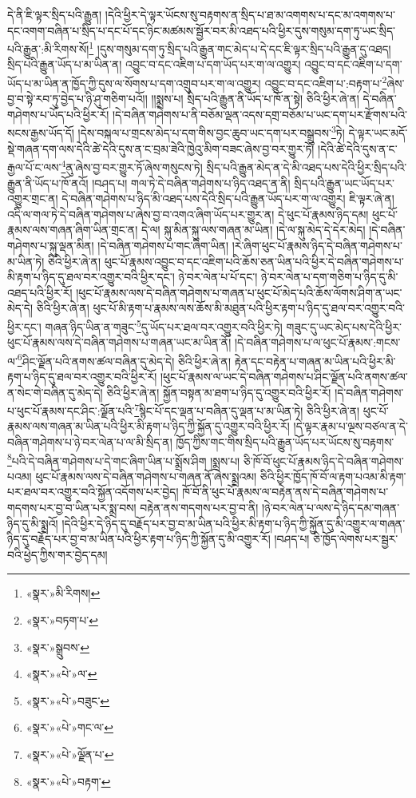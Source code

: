 དེ་ནི་ཇི་ལྟར་སྲིད་པའི་རྒྱུན། །དེའི་ཕྱིར་དེ་ལྟར་ཡོངས་སུ་བརྟགས་ན་སྲིད་པ་ཐ་མ་འགགས་པ་དང་མ་འགགས་པ་དང་འགག་བཞིན་པ་སྲིད་པ་དང་པོ་དང་ཉིང་མཚམས་སྦྱོར་བར་མི་འཐད་པའི་ཕྱིར་དུས་གསུམ་དག་ཏུ་ཡང་སྲིད་པའི་རྒྱུན་:མི་རིགས་སོ།\footnote{«སྣར་»མི་རིགས།} །དུས་གསུམ་དག་ཏུ་སྲིད་པའི་རྒྱུན་གང་མེད་པ་དེ་དང་ཇི་ལྟར་སྲིད་པའི་རྒྱུན་དུ་འཐད། སྲིད་པའི་རྒྱུན་ཡོད་པ་མ་ཡིན་ན། འབྱུང་བ་དང་འཇིག་པ་དག་ཡོད་པར་ག་ལ་འགྱུར། འབྱུང་བ་དང་འཇིག་པ་དག་ཡོད་པ་མ་ཡིན་ན་ཁྱོད་ཀྱི་དུས་ལ་སོགས་པ་དག་འགྲུབ་པར་ག་ལ་འགྱུར། འབྱུང་བ་དང་འཇིག་པ་:བརྟག་པ་\footnote{«སྣར་»བཏག་པ་}ཞེས་བྱ་བ་སྟེ་རབ་ཏུ་བྱེད་པ་ཉི་ཤུ་གཅིག་པའོ།། །།སྨྲས་པ། སྲིད་པའི་རྒྱུན་ནི་ཡོད་པ་ཁོ་ན་སྟེ། ཅིའི་ཕྱིར་ཞེ་ན། དེ་བཞིན་གཤེགས་པ་ཡོད་པའི་ཕྱིར་རོ། །དེ་བཞིན་གཤེགས་པ་ནི་བཅོམ་ལྡན་འདས་དགྲ་བཅོམ་པ་ཡང་དག་པར་རྫོགས་པའི་སངས་རྒྱས་ཡོད་དོ། །དེས་བསྐལ་པ་གྲངས་མེད་པ་དག་གིས་བྱང་ཆུབ་ཡང་དག་པར་བསྒྲུབས་\footnote{«སྣར་»སྒྲུབས་}ཏེ། དེ་ལྟར་ཡང་མདོ་སྡེ་གཞན་དག་ལས་དེའི་ཚེ་དེའི་དུས་ན་ང་བྲམ་ཟེའི་ཁྱེའུ་མིག་བཟང་ཞེས་བྱ་བར་གྱུར་ཏོ། །དེའི་ཚེ་དེའི་དུས་ན་ང་རྒྱལ་པོ་ང་ལས་\footnote{«སྣར་»«པེ་»ལ་}ནུ་ཞེས་བྱ་བར་གྱུར་ཏོ་ཞེས་གསུངས་ཏེ། སྲིད་པའི་རྒྱུན་མེད་ན་དེ་མི་འཐད་པས་དེའི་ཕྱིར་སྲིད་པའི་རྒྱུན་ནི་ཡོད་པ་ཁོ་ནའོ། །བཤད་པ། གལ་ཏེ་དེ་བཞིན་གཤེགས་པ་ཉིད་འཐད་ན་ནི། སྲིད་པའི་རྒྱུན་ཡང་ཡོད་པར་འགྱུར་གྲང་ན། དེ་བཞིན་གཤེགས་པ་ཉིད་མི་འཐད་པས་དེའི་སྲིད་པའི་རྒྱུན་ཡོད་པར་ག་ལ་འགྱུར། ཇི་ལྟར་ཞེ་ན། འདི་ལ་གལ་ཏེ་དེ་བཞིན་གཤེགས་པ་ཞེས་བྱ་བ་འགའ་ཞིག་ཡོད་པར་གྱུར་ན། དེ་ཕུང་པོ་རྣམས་ཉིད་དམ། ཕུང་པོ་རྣམས་ལས་གཞན་ཞིག་ཡིན་གྲང་ན། དེ་ལ། སྐུ་མིན་སྐུ་ལས་གཞན་མ་ཡིན། །དེ་ལ་སྐུ་མེད་དེ་དེར་མེད། །དེ་བཞིན་གཤེགས་པ་སྐུ་ལྡན་མིན། །དེ་བཞིན་གཤེགས་པ་གང་ཞིག་ཡིན། །རེ་ཞིག་ཕུང་པོ་རྣམས་ཉིད་དེ་བཞིན་གཤེགས་པ་མ་ཡིན་ཏེ། ཅིའི་ཕྱིར་ཞེ་ན། ཕུང་པོ་རྣམས་འབྱུང་བ་དང་འཇིག་པའི་ཆོས་ཅན་ཡིན་པའི་ཕྱིར་དེ་བཞིན་གཤེགས་པ་མི་རྟག་པ་ཉིད་དུ་ཐལ་བར་འགྱུར་བའི་ཕྱིར་དང་། ཉེ་བར་ལེན་པ་པོ་དང་། ཉེ་བར་ལེན་པ་དག་གཅིག་པ་ཉིད་དུ་མི་འཐད་པའི་ཕྱིར་རོ། །ཕུང་པོ་རྣམས་ལས་དེ་བཞིན་གཤེགས་པ་གཞན་པ་ཕུང་པོ་མེད་པའི་ཆོས་ལོགས་ཤིག་ན་ཡང་མེད་དེ། ཅིའི་ཕྱིར་ཞེ་ན། ཕུང་པོ་མི་རྟག་པ་རྣམས་ལས་ཆོས་མི་མཐུན་པའི་ཕྱིར་རྟག་པ་ཉིད་དུ་ཐལ་བར་འགྱུར་བའི་ཕྱིར་དང་། གཞན་ཉིད་ཡིན་ན་གཟུང་\footnote{«སྣར་»«པེ་»བཟུང་}དུ་ཡོད་པར་ཐལ་བར་འགྱུར་བའི་ཕྱིར་ཏེ། གཟུང་དུ་ཡང་མེད་པས་དེའི་ཕྱིར་ཕུང་པོ་རྣམས་ལས་དེ་བཞིན་གཤེགས་པ་གཞན་ཡང་མ་ཡིན་ནོ། །དེ་བཞིན་གཤེགས་པ་ལ་ཕུང་པོ་རྣམས་:གངས་ལ་\footnote{«སྣར་»«པེ་»གང་ལ་}ཤིང་ལྗོན་པའི་ནགས་ཚལ་བཞིན་དུ་མེད་དེ། ཅིའི་ཕྱིར་ཞེ་ན། རྟེན་དང་བརྟེན་པ་གཞན་མ་ཡིན་པའི་ཕྱིར་མི་རྟག་པ་ཉིད་དུ་ཐལ་བར་འགྱུར་བའི་ཕྱིར་རོ། །ཕུང་པོ་རྣམས་ལ་ཡང་དེ་བཞིན་གཤེགས་པ་ཤིང་ལྗོན་པའི་ནགས་ཚལ་ན་སེང་གེ་བཞིན་དུ་མེད་དེ། ཅིའི་ཕྱིར་ཞེ་ན། སྐྱོན་བསྟན་མ་ཐག་པ་ཉིད་དུ་འགྱུར་བའི་ཕྱིར་རོ། །དེ་བཞིན་གཤེགས་པ་ཕུང་པོ་རྣམས་དང་ཤིང་:ལྗོན་པའི་\footnote{«སྣར་»«པེ་»ལྗོན་པ་}སྙིང་པོ་དང་ལྡན་པ་བཞིན་དུ་ལྡན་པ་མ་ཡིན་ཏེ། ཅིའི་ཕྱིར་ཞེ་ན། ཕུང་པོ་རྣམས་ལས་གཞན་མ་ཡིན་པའི་ཕྱིར་མི་རྟག་པ་ཉིད་ཀྱི་སྐྱོན་དུ་འགྱུར་བའི་ཕྱིར་རོ། །དེ་ལྟར་རྣམ་པ་ལྔས་བཙལ་ན་དེ་བཞིན་གཤེགས་པ་ཉེ་བར་ལེན་པ་ལ་མི་སྲིད་ན། ཁྱོད་ཀྱིས་གང་གིས་སྲིད་པའི་རྒྱུན་ཡོད་པར་ཡོངས་སུ་བརྟགས་\footnote{«སྣར་»«པེ་»བརྟག་}པའི་དེ་བཞིན་གཤེགས་པ་དེ་གང་ཞིག་ཡིན་པ་སྨྲོས་ཤིག །སྨྲས་པ། ཅི་ཁོ་བོ་ཕུང་པོ་རྣམས་ཉིད་དེ་བཞིན་གཤེགས་པའམ། ཕུང་པོ་རྣམས་ལས་དེ་བཞིན་གཤེགས་པ་གཞན་ནོ་ཞེས་སྨྲའམ། ཅིའི་ཕྱིར་ཁྱོད་ཁོ་བོ་ལ་རྟག་པའམ་མི་རྟག་པར་ཐལ་བར་འགྱུར་བའི་སྐྱོན་འདོགས་པར་བྱེད། ཁོ་བོ་ནི་ཕུང་པོ་རྣམས་ལ་བརྟེན་ནས་དེ་བཞིན་གཤེགས་པ་གདགས་པར་བྱ་བ་ཡིན་པར་སྨྲ་བས། བརྟེན་ནས་གདགས་པར་བྱ་བ་ནི། །ཉེ་བར་ལེན་པ་ལས་དེ་ཉིད་དམ་གཞན་ཉིད་དུ་མི་སྨྲའོ། །དེའི་ཕྱིར་དེ་ཉིད་དུ་བརྗོད་པར་བྱ་བ་མ་ཡིན་པའི་ཕྱིར་མི་རྟག་པ་ཉིད་ཀྱི་སྐྱོན་དུ་མི་འགྱུར་ལ་གཞན་ཉིད་དུ་བརྗོད་པར་བྱ་བ་མ་ཡིན་པའི་ཕྱིར་རྟག་པ་ཉིད་ཀྱི་སྐྱོན་དུ་མི་འགྱུར་རོ། །བཤད་པ། ཅི་ཁྱོད་ལེགས་པར་སྦྱར་བའི་ཕྱེད་ཀྱིས་གར་བྱེད་དམ། 